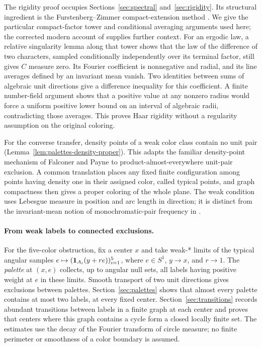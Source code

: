 The rigidity proof occupies Sections~\ref{sec:spectral}
and~\ref{sec:rigidity}. Its structural ingredient is the
Furstenberg--Zimmer compact-extension method
\citep{Furstenberg1977,ZimmerExtensions1976,ZimmerDiscrete1976}.
We give the particular compact-factor tower and conditional averaging
arguments used here; the corrected modern account of
\citet{JamneshanStructure,JamneshanCorrigendum} supplies further
context. For an ergodic law, a relative singularity lemma along that
tower shows that the
law of the difference of two characters, sampled conditionally independently
over its terminal factor, still gives $C$ measure zero. Its Fourier
coefficient is nonnegative and radial, and its line averages defined
by an invariant mean vanish.
Two identities between sums of algebraic unit directions give a difference
inequality for this coefficient. A finite number-field argument shows
that a positive value at any nonzero radius would force a uniform positive
lower bound on an interval of algebraic radii, contradicting those averages.
This proves Haar rigidity without a regularity assumption on the original
coloring.

For the converse transfer, density points of a weak color class contain no unit pair
(Lemma~\ref{lem:palettes-density-proper}). This adapts the familiar
density-point mechanism of Falconer and Payne to product-almost-everywhere
unit-pair exclusion. A common
translation places any fixed finite configuration among points having
density one in their assigned color, called typical points,
and graph compactness then gives a proper coloring of the whole plane.
The weak condition uses Lebesgue measure in position and arc length in
direction; it is distinct from the invariant-mean notion of
monochromatic-pair frequency in \citet{GwynStavrianos2020}.

\paragraph{From weak labels to connected exclusions.}
For the five-color obstruction, fix a center $x$ and take weak-* limits
of the typical angular samples
$e\mapsto(\mathbf 1_{A_i}(y+re))_{i=1}^5$, where $e\in S^1$,
$y\to x$, and $r\to1$. The \emph{palette} at $(x,e)$ collects,
up to angular null sets, all labels having positive weight at $e$ in
these limits. Smooth transport of two unit directions gives exclusions
between palettes. Section~\ref{sec:palettes}
shows that almost every palette contains at most two labels, at every
fixed center. Section~\ref{sec:transitions} records abundant transitions
between labels in a finite graph at each center and proves that centers
where this graph contains a cycle form a closed locally finite set.
The estimates use the decay of the Fourier transform of circle measure;
no finite perimeter or smoothness of a color boundary is assumed.

